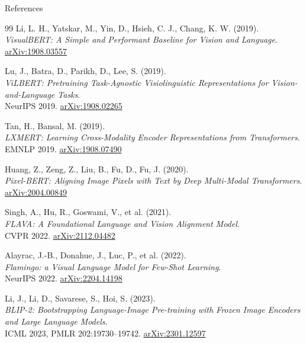 \begin{frame}[allowframebreaks]{References}
\begin{thebibliography}{99}
      Li, L. H., Yatskar, M., Yin, D., Hsieh, C. J., Chang, K. W. (2019). \\
      \emph{VisualBERT: A Simple and Performant Baseline for Vision and Language}.\\
      \href{https://arxiv.org/abs/1908.03557}{arXiv:1908.03557}

      Lu, J., Batra, D., Parikh, D., Lee, S. (2019). \\
      \emph{ViLBERT: Pretraining Task-Agnostic Visiolinguistic Representations for Vision-and-Language Tasks}.\\
      NeurIPS 2019. \href{https://arxiv.org/abs/1908.02265}{arXiv:1908.02265}

      Tan, H., Bansal, M. (2019). \\
      \emph{LXMERT: Learning Cross-Modality Encoder Representations from Transformers}.\\
      EMNLP 2019. \href{https://arxiv.org/abs/1908.07490}{arXiv:1908.07490}

      Huang, Z., Zeng, Z., Liu, B., Fu, D., Fu, J. (2020). \\
      \emph{Pixel-BERT: Aligning Image Pixels with Text by Deep Multi-Modal Transformers}.\\
      \href{https://arxiv.org/abs/2004.00849}{arXiv:2004.00849}

      Singh, A., Hu, R., Goswami, V., et al. (2021). \\
      \emph{FLAVA: A Foundational Language and Vision Alignment Model}.\\
      CVPR 2022. \href{https://arxiv.org/abs/2112.04482}{arXiv:2112.04482}

      Alayrac, J.-B., Donahue, J., Luc, P., et al. (2022). \\
      \emph{Flamingo: a Visual Language Model for Few-Shot Learning}.\\
      NeurIPS 2022. \href{https://arxiv.org/abs/2204.14198}{arXiv:2204.14198}

      Li, J., Li, D., Savarese, S., Hoi, S. (2023). \\
      \emph{BLIP-2: Bootstrapping Language-Image Pre-training with Frozen Image Encoders and Large Language Models}.\\
      ICML 2023, PMLR 202:19730--19742. \href{https://arxiv.org/abs/2301.12597}{arXiv:2301.12597}


\end{thebibliography}
\end{frame}
